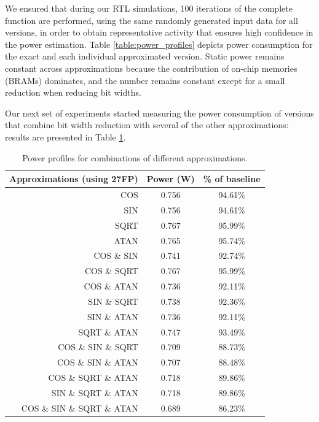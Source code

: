 \par We ensured that during our RTL simulations, 100 iterations of the complete function are performed, using the same randomly generated input data for all versions, in order to obtain representative activity that ensures high confidence in the power estimation. Table \ref{table:power_profiles} depicts power consumption for the exact and each individual approximated version. Static power remains constant across approximations because the contribution of on-chip memories (BRAMs) dominates, and the number remains constant except for a small reduction when reducing bit widths. 
\par Our next set of experiments started measuring the power consumption of versions that combine bit width reduction with several of the other approximations: results are presented in Table \ref{table:power_profiles_comb}.



\begin{table}[h]
\begin{tabular}{r c c}
\toprule
Approximations (using 27FP) & Power (W) & \% of baseline\\
\hline
COS & 						0.756	& 94.61\%\\
SIN & 						0.756	& 94.61\%\\
SQRT & 						0.767	& 95.99\%\\
ATAN & 						0.765	& 95.74\%\\
COS \& SIN & 				0.741	& 92.74\%\\
COS \& SQRT& 				0.767	& 95.99\%\\
COS \& ATAN & 				0.736	& 92.11\%\\
SIN \& SQRT & 				0.738	& 92.36\%\\
SIN \& ATAN & 				0.736	& 92.11\%\\
SQRT \& ATAN & 				0.747	& 93.49\%\\
COS \& SIN \& SQRT & 		0.709	& 88.73\%\\
COS \& SIN \& ATAN& 		0.707	& 88.48\%\\
COS \& SQRT \& ATAN& 		0.718	& 89.86\%\\
SIN \& SQRT \& ATAN  & 		0.718	& 89.86\%\\
COS \& SIN \& SQRT \& ATAN &0.689 	& 86.23\%\\
\hline
\end{tabular}
\caption{Power profiles for combinations of different approximations.}
\label{table:power_profiles_comb}
\end{table}


